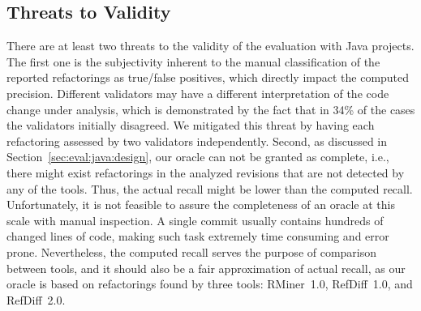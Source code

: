 \subsection{Threats to Validity}
\label{SecThreatsJava}

There are at least two threats to the validity of the evaluation with Java projects.
The first one is the subjectivity inherent to the manual classification of the reported refactorings as true/false positives, which directly impact the computed precision.
Different validators may have a different interpretation of the code change under analysis, which is demonstrated by the fact that in 34\% of the cases the validators initially disagreed.
We mitigated this threat by having each refactoring assessed by two validators independently.
Second, as discussed in Section~\ref{sec:eval:java:design}, our oracle can not be granted as complete, i.e., there might exist refactorings in the analyzed revisions that are not detected by any of the tools.
Thus, the actual recall might be lower than the computed recall.
Unfortunately, it is not feasible to assure the completeness of an oracle at this scale with manual inspection.
A single commit usually contains hundreds of changed lines of code, making such task extremely time consuming and error prone.
Nevertheless, the computed recall serves the purpose of comparison between tools, and it should also be a fair approximation of actual recall, as our oracle is based on refactorings found by three tools: RMiner~1.0, RefDiff~1.0, and RefDiff~2.0.

